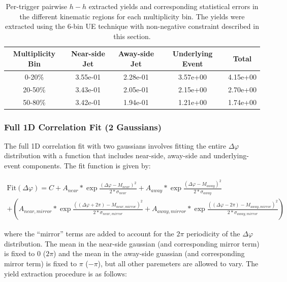 \documentclass[ALICE,manyauthors]{ALICE_analysis_notes}
\begin{document}
\begin{table}[h!]
\centering
\begin{tabular}{| c | c | c | c | c | }
\hline
Multiplicity Bin & Near-side Jet & Away-side Jet & Underlying Event & Total  \\
\hline

0-20\% & 3.55e-01  & 2.28e-01  & 3.57e+00 & 4.15e+00 \\
20-50\% & 3.43e-01 & 2.05e-01  & 2.15e+00 & 2.70e+00 \\
50-80\% & 3.42e-01 & 1.94e-01  & 1.21e+00 & 1.74e+00 \\

\hline
\end{tabular}
\caption{Per-trigger pairwise $h-h$ extracted yields and corresponding statistical errors in the different kinematic regions for each multiplicity bin. The yields were extracted using the 6-bin UE technique with non-negative constraint described in this section.}
\label{h_h_yield_table_6bin_nonzero}
\end{table}


\subsubsection{Full 1D Correlation Fit (2 Gaussians)}
\label{full_correlation_fit}
The full 1D correlation fit with two gaussians involves fitting the entire $\Delta\varphi$ distribution with a function that includes near-side, away-side and underlying-event components. The fit function is given by:

\begin{gather*}
	\text{Fit}(\Delta\varphi) = C + A_{near}*\exp{\frac{(\Delta\varphi - M_{near})^2}{2*\sigma_{near}}} + A_{away}*\exp{\frac{(\Delta\varphi - M_{away})^2}{2*\sigma_{away}}} \\
	+ (A_{near,mirror}*\exp{\frac{((\Delta\varphi+2\pi) - M_{near,mirror})^2}{2*\sigma_{near,mirror}}} + A_{away,mirror}*\exp{\frac{((\Delta\varphi-2\pi) - M_{away,mirror})^2}{2*\sigma_{away,mirror}}})
\end{gather*}

where the ``mirror'' terms are added to account for the $2\pi$ periodicity of the $\Delta\varphi$ distribution. The mean in the near-side gaussian (and corresponding mirror term) is fixed to 0 ($2\pi$) and the mean in the away-side guassian (and corresponding mirror term) is fixed to $\pi$ ($-\pi$), but all other paremeters are allowed to vary. The yield extraction procedure is as follows:
\end{document}
